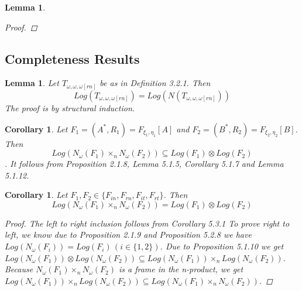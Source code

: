 \documentclass[12pt, a4paper]{scrartcl}
\newtheorem{lemma}[definition]{Lemma}
\newtheorem{corollary}[definition]{Corollary}
\begin{document}
\begin{lemma}
\begin{proof}
        \end{proof}
    \end{lemma}

    \subsection{Completeness Results}

    \begin{lemma}
    Let $T_{\omega,\omega,\omega[rn]}$ be as in Definition 3.2.1. Then 
    $$Log(T_{\omega,\omega,\omega[rn]}) = Log(N(T_{\omega,\omega,\omega[rn]}))$$ \newline
    The proof is by structural induction.

    \end{lemma}

    \begin{corollary}
        Let $F_1 = (A^*,R_1) = F_{\xi_1, \eta_1}[A]$ and $F_2 = (B^*,R_2) = F_{\xi_2, \eta_2}[B]$. Then 
        $$Log(N_\omega(F_1) \times_n N_\omega(F_2))  \subseteq Log(F_1) \otimes Log(F_2)$$.
        It follows from Proposition 2.1.8, Lemma 5.1.5, Corollary 5.1.7 and Lemma 5.1.12.
    \end{corollary}

    \begin{corollary}
        Let $F_1, F_2 \in \{F_{in}, F_{rn}, F_{it}, F_{rt}\}$. Then 
        $$Log(N_\omega(F_1) \times_nN_\omega(F_2)) = Log(F_1) \otimes Log(F_2)$$

        \begin{proof}
            The left to right inclusion follows from Corollary 5.3.1 \newline \newline
            To prove right to left, we know due to Proposition 2.1.9 and Proposition 5.2.8 we have $Log(N_\omega(F_i)) = Log(F_i) \, (i \in \{1,2\})$.
            Due to Proposition 5.1.10 we get $Log(N_\omega(F_1)) \otimes Log(N_\omega(F_2)) \subseteq Log(N_\omega(F_1)) \times_n Log(N_\omega(F_2))$. 
            Because $N_\omega(F_1)\times_n N_\omega(F_2)$ is a frame in the n-product, we get
            $Log(N_\omega(F_1)) \times_n Log(N_\omega(F_2)) \subseteq Log(N_\omega(F_1)\times_n N_\omega(F_2))$.

        \end{proof}

    \end{corollary}
\end{document}
